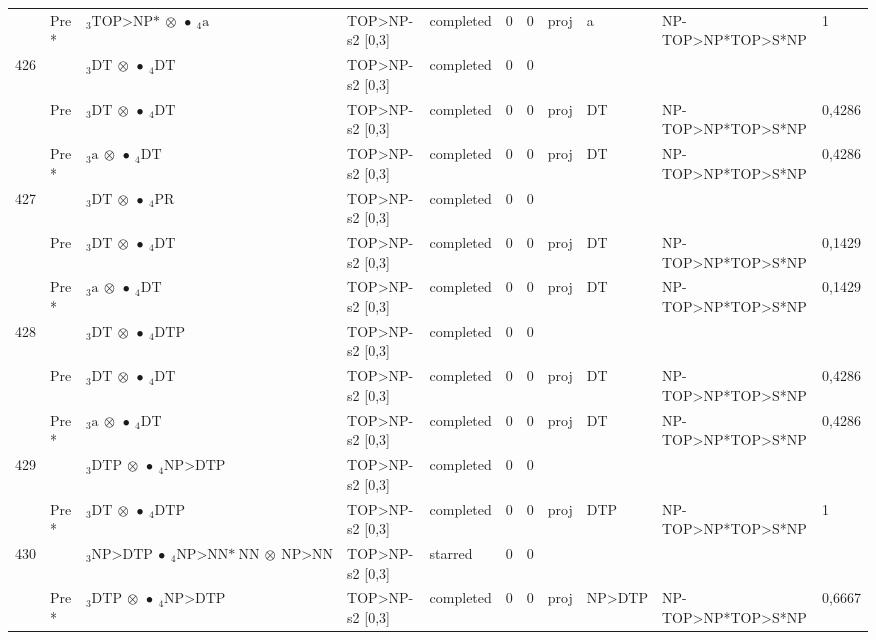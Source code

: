 \documentclass[10pt]{article}
\begin{document}
\begin{longtable}[htbp]{lllllllllll}
 & Pre *& $ {}_3 \textrm{TOP>NP*} \  \otimes \  \bullet \ {}_{4} \textrm{a} $ & TOP>NP-s2 [0,3] & completed & 0 & 0 & proj & a & NP-TOP>NP*TOP>S*NP & 1 \\ 
426 & & $ {}_3 \textrm{DT} \  \otimes \  \bullet \ {}_{4} \textrm{DT} $ & TOP>NP-s2 [0,3] & completed & 0 & 0 & & & & \\ 
 & Pre & $ {}_3 \textrm{DT} \  \otimes \  \bullet \ {}_{4} \textrm{DT} $ & TOP>NP-s2 [0,3] & completed & 0 & 0 & proj & DT & NP-TOP>NP*TOP>S*NP & 0,4286 \\ 
 & Pre *& $ {}_3 \textrm{a} \  \otimes \  \bullet \ {}_{4} \textrm{DT} $ & TOP>NP-s2 [0,3] & completed & 0 & 0 & proj & DT & NP-TOP>NP*TOP>S*NP & 0,4286 \\ 
427 & & $ {}_3 \textrm{DT} \  \otimes \  \bullet \ {}_{4} \textrm{PR} $ & TOP>NP-s2 [0,3] & completed & 0 & 0 & & & & \\ 
 & Pre & $ {}_3 \textrm{DT} \  \otimes \  \bullet \ {}_{4} \textrm{DT} $ & TOP>NP-s2 [0,3] & completed & 0 & 0 & proj & DT & NP-TOP>NP*TOP>S*NP & 0,1429 \\ 
 & Pre *& $ {}_3 \textrm{a} \  \otimes \  \bullet \ {}_{4} \textrm{DT} $ & TOP>NP-s2 [0,3] & completed & 0 & 0 & proj & DT & NP-TOP>NP*TOP>S*NP & 0,1429 \\ 
428 & & $ {}_3 \textrm{DT} \  \otimes \  \bullet \ {}_{4} \textrm{DTP} $ & TOP>NP-s2 [0,3] & completed & 0 & 0 & & & & \\ 
 & Pre & $ {}_3 \textrm{DT} \  \otimes \  \bullet \ {}_{4} \textrm{DT} $ & TOP>NP-s2 [0,3] & completed & 0 & 0 & proj & DT & NP-TOP>NP*TOP>S*NP & 0,4286 \\ 
 & Pre *& $ {}_3 \textrm{a} \  \otimes \  \bullet \ {}_{4} \textrm{DT} $ & TOP>NP-s2 [0,3] & completed & 0 & 0 & proj & DT & NP-TOP>NP*TOP>S*NP & 0,4286 \\ 
429 & & $ {}_3 \textrm{DTP} \  \otimes \  \bullet \ {}_{4} \textrm{NP>DTP} $ & TOP>NP-s2 [0,3] & completed & 0 & 0 & & & & \\ 
 & Pre *& $ {}_3 \textrm{DT} \  \otimes \  \bullet \ {}_{4} \textrm{DTP} $ & TOP>NP-s2 [0,3] & completed & 0 & 0 & proj & DTP & NP-TOP>NP*TOP>S*NP & 1 \\ 
430 & & $ {}_3 \textrm{NP>DTP} \  \bullet \ {}_{4} \textrm{NP>NN*} \ \textrm{NN} \  \otimes \ \textrm{NP>NN} $ & TOP>NP-s2 [0,3] & starred & 0 & 0 & & & & \\ 
 & Pre *& $ {}_3 \textrm{DTP} \  \otimes \  \bullet \ {}_{4} \textrm{NP>DTP} $ & TOP>NP-s2 [0,3] & completed & 0 & 0 & proj & NP>DTP & NP-TOP>NP*TOP>S*NP & 0,6667 \\ 

\end{longtable}
\end{document}
